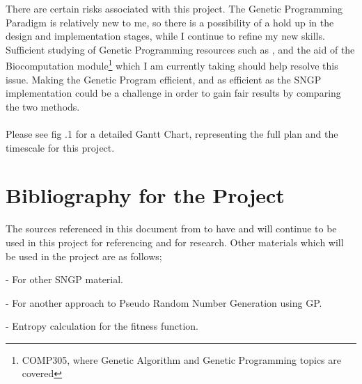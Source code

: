 \documentclass[a4paper,10.5pt]{article}
\begin{document}
There are certain risks associated with this project. The Genetic Programming Paradigm is relatively new to me, so there is a possibility of a hold up in the design and implementation stages, while I continue to refine my new skills. Sufficient studying of Genetic Programming resources such as \cite{mitchell, introgp, kozagpbook}, and the aid of the Biocomputation module\footnote{COMP305, where Genetic Algorithm and Genetic Programming topics are covered} which I am currently taking should help resolve this issue. Making the Genetic Program efficient, and as efficient as the SNGP implementation could be a challenge in order to gain fair results by comparing the two methods.\\\\
Please see fig .1 for a detailed Gantt Chart, representing the full plan and the timescale for this project.
\section{Bibliography for the Project}
The sources referenced in this document from \cite{kozarng} to \cite{cprog} have and will continue to be used in this project for referencing and for research. Other materials which will be used in the project are as follows;

- \cite{jacksonsngp2} For other SNGP material.

-  \cite{prnggp} For another approach to Pseudo Random Number Generation using GP.

- \cite{entropy} Entropy calculation for the fitness function. 
\end{document}
